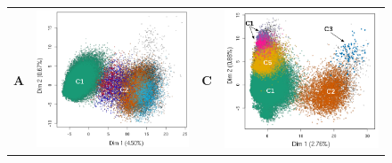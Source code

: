 \documentclass[12pt,a4paper]{article}
\begin{document}
\begin{figure}
\begin{tabular}{cc|cc}
		\textbf{A} & \includegraphics[scale=0.35]{img/solatus_ACP1.png} & \textbf{C} & \includegraphics[scale=0.35]{img/pogonias_ACP1.png} \\

\end{tabular}
\end{figure}
\end{document}
